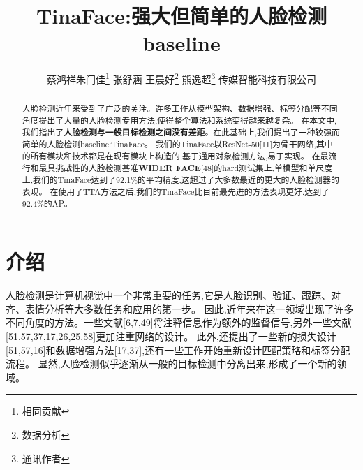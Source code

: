 \documentclass[twocolumn,10pt,a4paper]{article}%
\title{\fontsize{18pt}{27pt}\selectfont%
	{\heiti%
	TinaFace:强大但简单的人脸检测baseline
	}}%
\author{\fontsize{12pt}{18pt}\selectfont%
	{\fangsong%
	{蔡鸿祥朱闫佳}\thanks{相同贡献} 张舒涵 王晨好\thanks{数据分析} 熊逸超\thanks{通讯作者} 
	传媒智能科技有限公司}\\%
	\fontsize{10.5pt}{15.75pt}\selectfont%
}
\begin{document}
	\maketitle%
	 
	\lhead{}%
	\chead{}%
	\rhead{}%
	\lfoot{}%
	\cfoot{\thepage}%
	\rfoot{}%
	 
	\begin{abstract}
		人脸检测近年来受到了广泛的关注。许多工作从模型架构、数据增强、标签分配等不同角度提出了大量的人脸检测专用方法,使得整个算法和系统变得越来越复杂。
		在本文中,我们指出了\textbf{人脸检测与一般目标检测之间没有差距}。在此基础上,我们提出了一种较强而简单的人脸检测baseline:TinaFace。
		我们的TinaFace以ResNet-50[11]为骨干网络,其中的所有模块和技术都是在现有模块上构造的,基于通用对象检测方法,易于实现。
		在最流行和最具挑战性的人脸检测基准\textbf{WIDER FACE}[48]的hard测试集上,单模型和单尺度上,我们的TinaFace达到了92.1\%的平均精度,这超过了大多数最近的更大的人脸检测器的表现。
		在使用了TTA方法之后,我们的TinaFace比目前最先进的方法表现更好,达到了92.4\%的AP。
	\end{abstract}
	
	

	
	
	\section{介绍}
	人脸检测是计算机视觉中一个非常重要的任务,它是人脸识别、验证、跟踪、对齐、表情分析等大多数任务和应用的第一步。
	因此,近年来在这一领域出现了许多不同角度的方法。一些文献[6,7,49]将注释信息作为额外的监督信号,另外一些文献[51,57,37,17,26,25,58]更加注重网络的设计。
	此外,还提出了一些新的损失设计[51,57,16]和数据增强方法[17,37],还有一些工作开始重新设计匹配策略和标签分配流程。
	显然,人脸检测似乎逐渐从一般的目标检测中分离出来,形成了一个新的领域。
\end{document}
